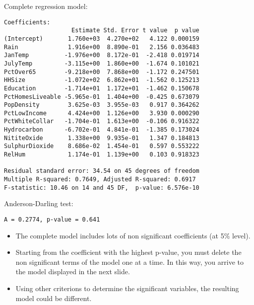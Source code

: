 \begin{frame}[fragile]
   Complete regression model:
  \begin{tiny}
    \begin{verbatim}
Coefficients:
                   Estimate Std. Error t value  p value    
(Intercept)       1.760e+03  4.270e+02   4.122 0.000159
Rain              1.916e+00  8.890e-01   2.156 0.036483
JanTemp          -1.976e+00  8.172e-01  -2.418 0.019714
JulyTemp         -3.115e+00  1.860e+00  -1.674 0.101021    
PctOver65        -9.218e+00  7.868e+00  -1.172 0.247501    
HHSize           -1.072e+02  6.862e+01  -1.562 0.125213    
Education        -1.714e+01  1.172e+01  -1.462 0.150678    
PctHomesLiveable -5.965e-01  1.404e+00  -0.425 0.673079    
PopDensity        3.625e-03  3.955e-03   0.917 0.364262    
PctLowIncome      4.424e+00  1.126e+00   3.930 0.000290
PctWhiteCollar   -1.704e-01  1.613e+00  -0.106 0.916322    
Hydrocarbon      -6.702e-01  4.841e-01  -1.385 0.173024    
NititeOxide       1.338e+00  9.935e-01   1.347 0.184813    
SulphurDioxide    8.686e-02  1.454e-01   0.597 0.553222    
RelHum            1.174e-01  1.139e+00   0.103 0.918323    

Residual standard error: 34.54 on 45 degrees of freedom
Multiple R-squared: 0.7649,	Adjusted R-squared: 0.6917 
F-statistic: 10.46 on 14 and 45 DF,  p-value: 6.576e-10 
    \end{verbatim}
  \end{tiny}
  Anderson-Darling test:\\
  \begin{small}
    \begin{verbatim}
A = 0.2774, p-value = 0.641
    \end{verbatim}
  \end{small}
\end{frame}

\begin{frame}
  \vspace{0.75cm}
  \begin{itemize}
    \item The complete model includes lots of non significant coefficients (at 5\% level).
    \vspace{0.75cm}
    \item Starting from the coefficient with the highest p-value, you must delete the non significant terms of the model one at a time. In this way, you arrive to the model displayed in the next slide.
    \vspace{0.75cm}
    \item Using other criterions to determine the significant variables, the resulting model could be different.
  \end{itemize}
\end{frame}

